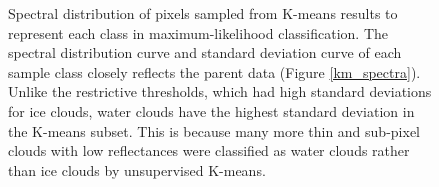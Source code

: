 \documentclass[12pt]{article}
\begin{document}
\begin{figure}[h!]
    \centering

    \begin{center}
    \end{center}

    \caption{Spectral distribution of pixels sampled from K-means results to represent each class in maximum-likelihood classification. The spectral distribution curve and standard deviation curve of each sample class closely reflects the parent data (Figure \ref{km_spectra}). Unlike the restrictive thresholds, which had high standard deviations for ice clouds, water clouds have the highest standard deviation in the K-means subset. This is because many more thin and sub-pixel clouds with low reflectances were classified as water clouds rather than ice clouds by unsupervised K-means.}
    \label{samples_km_spectra}
\end{figure}
\end{document}
